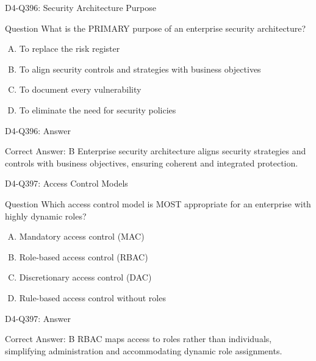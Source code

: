 \documentclass{beamer}
\begin{document}
\begin{frame}{D4-Q396: Security Architecture Purpose}
	\begin{block}{Question}
		What is the PRIMARY purpose of an enterprise security architecture?
	\end{block}
	\begin{enumerate}[(A)]
		\item To replace the risk register
		\item To align security controls and strategies with business objectives
		\item To document every vulnerability
		\item To eliminate the need for security policies
	\end{enumerate}
\end{frame}
\begin{frame}{D4-Q396: Answer}
	\begin{block}{Correct Answer: B}
		Enterprise security architecture aligns security strategies and controls with business objectives, ensuring coherent and integrated protection.
	\end{block}
\end{frame}

\begin{frame}{D4-Q397: Access Control Models}
	\begin{block}{Question}
		Which access control model is MOST appropriate for an enterprise with highly dynamic roles?
	\end{block}
	\begin{enumerate}[(A)]
		\item Mandatory access control (MAC)
		\item Role-based access control (RBAC)
		\item Discretionary access control (DAC)
		\item Rule-based access control without roles
	\end{enumerate}
\end{frame}
\begin{frame}{D4-Q397: Answer}
	\begin{block}{Correct Answer: B}
		RBAC maps access to roles rather than individuals, simplifying administration and accommodating dynamic role assignments.
	\end{block}
\end{frame}
\end{document}

